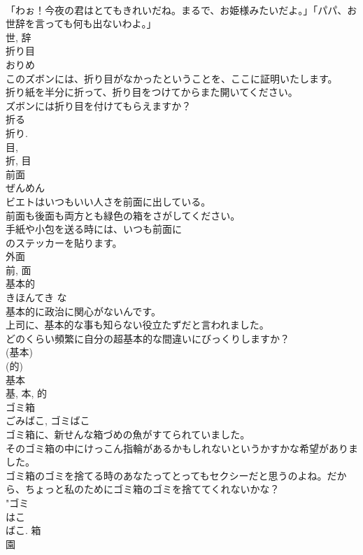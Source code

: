 \documentclass[8pt]{extreport}
\begin{document}
\begin{CJK}{UTF8}{min}
\\	「わぉ！今夜の君はとてもきれいだね。まるで、お姫様みたいだよ。」「パパ、お世辞を言っても何も出ないわよ。」	
\\	世, 辞	
\\	折り目	
\\	おりめ	
\\	このズボンには、折り目がなかったということを、ここに証明いたします。	
\\	折り紙を半分に折って、折り目をつけてからまた開いてください。	
\\	ズボンには折り目を付けてもらえますか？	
\\	折る 
\\	折り. 
\\	目, 
\\	折, 目	
\\	前面	
\\	ぜんめん	
\\	ビエトはいつもいい人さを前面に出している。	
\\	前面も後面も両方とも緑色の箱をさがしてください。	
\\	手紙や小包を送る時には、いつも前面に
\\	のステッカーを貼ります。	
\\	外面 
\\	前, 面	
\\	基本的	
\\	きほんてき	な 
\\	基本的に政治に関心がないんです。	
\\	上司に、基本的な事も知らない役立たずだと言われました。	
\\	どのくらい頻繁に自分の超基本的な間違いにびっくりしますか？	
\\	(基本) 
\\	(的) 
\\	基本 
\\	基, 本, 的	
\\	ゴミ箱	
\\	ごみばこ, ゴミばこ	
\\	ゴミ箱に、新せんな箱づめの魚がすてられていました。	
\\	そのゴミ箱の中にけっこん指輪があるかもしれないというかすかな希望がありました。	
\\	ゴミ箱のゴミを捨てる時のあなたってとってもセクシーだと思うのよね。だから、ちょっと私のためにゴミ箱のゴミを捨ててくれないかな？	
\\	"ゴミ 
\\	はこ 
\\	ばこ.	箱	
\\	園	

\end{CJK}
\end{document}
